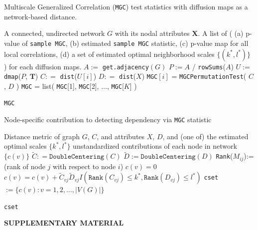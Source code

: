\documentclass[11pt]{article}
\theoremstyle{definition}
\begin{document}
\begin{algorithm}[ht]
	\caption{Multiscale Generalized Correlation (\texttt{MGC}) test statistics with diffusion maps as a network-based distance.}
	\begin{algorithmic}[1]
		\Require A connected, undirected network $G$ with its nodal attributes $\mathbf{X}$.
		\Ensure A list of \big(  (a) p-value of \texttt{sample MGC}, (b) estimated \texttt{sample MGC} statistic, (c) p-value map for all local correlations, (d) a set of estimated optimal neighborhood scales $\{  (k^{*}, l^{*}  ) \}$  \big) for each diffusion maps.
		\State $A :=$ \texttt{get.adjacency}$(G)$
		\State $P := A $ / \texttt{rowSums}($A$) 
		\State $U :=$ \texttt{dmap}($P$, $\mathbf{T}$) 
		\Begin
		\State $C : =$  \texttt{dist}($U[i]$) 
		\State $D : =$ \texttt{dist}($X$) 
		\State \texttt{MGC}$[i]$ = \texttt{MGCPermutationTest}( $C$, $D$ ) 
		\End
		\EndFor
		\State \texttt{MGC} = list( \texttt{MGC}[1], \texttt{MGC}[2], $\ldots$, \texttt{MGC}[$K$]  )
		
		\Return \texttt{MGC}
		\EndFunction
	\end{algorithmic}
\end{algorithm}

\begin{algorithm}[ht]
	\caption{Node-specific contribution to detecting dependency via \texttt{MGC} statistic}
	\begin{algorithmic}[1]
		\Require Distance metric of graph $G$, $C$, and attributes $X$, $D$, and (one of) the estimated optimal scales $\{ k^{*}, l^{*} \}$ 
		\Ensure  unstandardized contributions of each node in network $\{  c(v) \}$
		\State $\tilde{C} : = \texttt{DoubleCentering}(C)$
		\State $\tilde{D} := \texttt{DoubleCentering}(D)$
		\State \texttt{Rank}($M_{ij}$):= (rank of node $j$ with respect to node $i$)
		 
		\State $c(v) = 0$
		\Begin
		\State $c(v) =  c(v) + \tilde{C}_{vj} \tilde{D}_{v j} I(  \texttt{Rank}(C_{vj})  \leq k^{*}, \texttt{Rank}(D_{vj}) \leq l^{*} )$
		\End
		\EndFor
		\EndFor
		\State \texttt{cset} $:= \{ c(v) : v = 1,2, \ldots , |V(G)|  \}$	
		
		\Return  \texttt{cset}
		\EndFunction
	\end{algorithmic}
\end{algorithm}
\bigskip
\begin{center}
	{\large\bf SUPPLEMENTARY MATERIAL}
\end{center}
\end{document}
